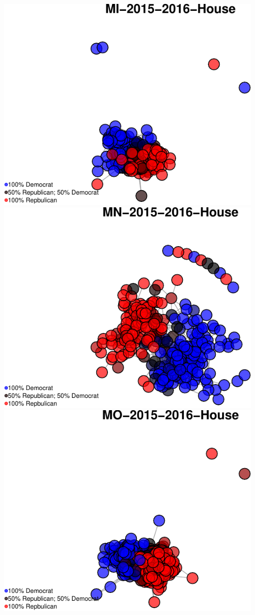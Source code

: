 \documentclass[]{article}
\begin{document}
\includegraphics{Final_Project_RMarkdown_Updated_files/figure-latex/unnamed-chunk-10-19.pdf}
\includegraphics{Final_Project_RMarkdown_Updated_files/figure-latex/unnamed-chunk-10-20.pdf}
\includegraphics{Final_Project_RMarkdown_Updated_files/figure-latex/unnamed-chunk-10-21.pdf}
\end{document}
